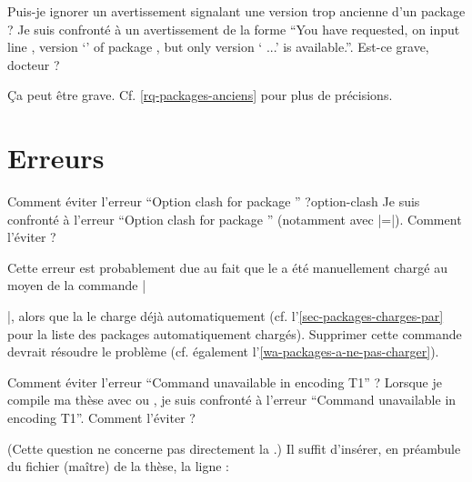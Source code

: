 \begin{dbfaq}{Puis-je ignorer un avertissement signalant une version trop
    ancienne d'un package ?}{}
  Je suis confronté à un avertissement de la forme \enquote{You have requested,
    on input line , version `' of package
    , but only version ` ...'
    is available.}. Est-ce grave, docteur ?
\end{dbfaq}

Ça peut être grave. Cf. \vref{rq-packages-anciens} pour plus de précisions.

\section{Erreurs}
\label{sec-erreurs}%
%
%

\begin{dbfaq}{Comment éviter l'erreur \enquote{Option clash for package
      } ?}{option-clash}
  Je suis confronté à l'erreur \enquote{Option clash for package }
  (notamment avec |=|). Comment l'éviter ?
\end{dbfaq}

Cette erreur est probablement due au fait que le  a été
manuellement chargé au moyen de la commande
|\usepackage[...]{|\meta{package}|}|, alors que la \yatCl{} le charge déjà
automatiquement (cf. l'\vref{sec-packages-charges-par} pour la liste des
packages automatiquement chargés). Supprimer cette commande devrait résoudre le
problème (cf. également l'\vref{wa-packages-a-ne-pas-charger}).

\begin{dbfaq}{Comment éviter l'erreur \enquote{Command
      \protect{} unavailable in encoding T1} ?}{}
  Lorsque je compile ma thèse avec  ou , je
  suis confronté à l'erreur \enquote{Command 
    unavailable in encoding T1}. Comment l'éviter ?
\end{dbfaq}

(Cette question ne concerne pas directement la \yatCl{}.) Il suffit
d'insérer, en préambule du fichier (maître) de la thèse, la ligne :
\begin{preamblecode}[title=Par exemple dans le \File{\configurationfile}]
\end{preamblecode}


